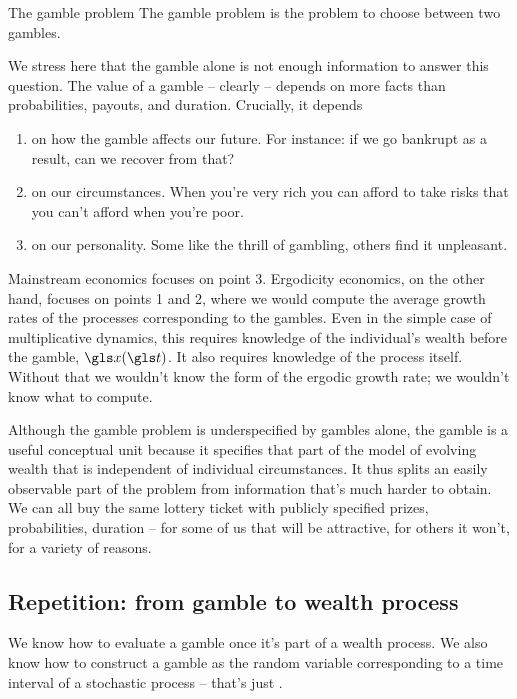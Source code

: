 \begin{defn}{The gamble problem}
The gamble problem is the problem to choose between two gambles.
\end{defn}

We stress here that the gamble alone is not enough information to answer this question. 
The value of a gamble -- clearly -- depends on more facts than probabilities, payouts, and duration. Crucially, it depends 
\begin{enumerate}
\item
on how the gamble affects our future. For instance: if we go bankrupt as a result, can we recover from that?
\item
on our circumstances. When you're very rich you can afford to take risks that you can't afford when you're poor. 
\item
on our personality. Some like the thrill of gambling, others find it unpleasant.
\end{enumerate}
Mainstream economics focuses on point 3. Ergodicity economics, on the other hand, focuses on points 1 and 2, 
where we would compute the average growth rates of the processes corresponding to the gambles. 
Even in the simple case of multiplicative dynamics, this requires knowledge of the individual's wealth 
before the gamble, $\x(\t)$. It also requires knowledge of the process itself. Without that we wouldn't 
know the form of the ergodic growth rate; we wouldn't know what to compute. 

Although the gamble problem is underspecified by gambles alone, the gamble is a 
useful conceptual unit because it specifies that part of the model of evolving wealth 
that is independent of individual circumstances. It thus splits an easily observable part
of the problem from information that's much harder to obtain. We can all buy the same 
lottery ticket with publicly specified prizes, probabilities, duration -- for some of us that 
will be attractive, for others it won't, for a variety of reasons.

\subsection{Repetition: from gamble to wealth process}
We know how to evaluate a gamble once it's part of a wealth process. 
We also know how to construct a gamble as the random variable 
corresponding to a time interval of a stochastic process -- that's just .


